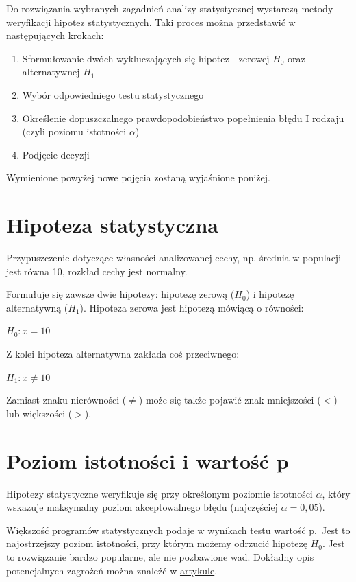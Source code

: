 \documentclass[
]{book}
\providecommand{\tightlist}{%
  \setlength{\itemsep}{0pt}\setlength{\parskip}{0pt}}
\begin{document}
Do rozwiązania wybranych zagadnień analizy statystycznej wystarczą metody weryfikacji hipotez statystycznych. Taki proces można przedstawić w następujących krokach:

\begin{enumerate}
\def\labelenumi{\arabic{enumi}.}
\tightlist
\item
  Sformułowanie dwóch wykluczających się hipotez - zerowej \(H_0\) oraz alternatywnej \(H_1\)
\item
  Wybór odpowiedniego testu statystycznego
\item
  Określenie dopuszczalnego prawdopodobieństwo popełnienia błędu I rodzaju (czyli poziomu istotności \(\alpha\))
\item
  Podjęcie decyzji
\end{enumerate}

Wymienione powyżej nowe pojęcia zostaną wyjaśnione poniżej.

\hypertarget{hipoteza-statystyczna}{%
\section{Hipoteza statystyczna}\label{hipoteza-statystyczna}}

Przypuszczenie dotyczące własności analizowanej cechy, np. średnia w populacji jest równa 10, rozkład cechy jest normalny.

Formułuje się zawsze dwie hipotezy: hipotezę zerową (\(H_0\)) i hipotezę alternatywną (\(H_1\)). Hipoteza zerowa jest hipotezą mówiącą o równości:

\(H_0: \bar{x}=10\)

Z kolei hipoteza alternatywna zakłada coś przeciwnego:

\(H_1: \bar{x}\neq 10\)

Zamiast znaku nierówności (\(\neq\)) może się także pojawić znak mniejszości (\(<\)) lub większości (\(>\)).

\hypertarget{poziom-istotnoux15bci-i-wartoux15bux107-p}{%
\section{Poziom istotności i wartość p}\label{poziom-istotnoux15bci-i-wartoux15bux107-p}}

Hipotezy statystyczne weryfikuje się przy określonym poziomie istotności \(\alpha\), który wskazuje maksymalny poziom akceptowalnego błędu (najczęściej \(\alpha=0,05\)).

Większość programów statystycznych podaje w wynikach testu wartość p.~Jest to najostrzejszy poziom istotności, przy którym możemy odrzucić hipotezę \(H_0\). Jest to rozwiązanie bardzo popularne, ale nie pozbawione wad. Dokładny opis potencjalnych zagrożeń można znaleźć w \href{http://cejsh.icm.edu.pl/cejsh/element/bwmeta1.element.cejsh-e3daa053-7cf2-4eee-9192-16c48c3a7a45/c/05.pdf}{artykule}.
\end{document}
